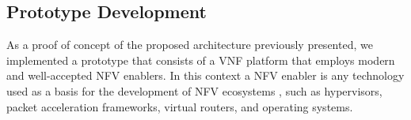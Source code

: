 

\subsection{Prototype Development}\label{PROTO}





As a proof of concept of the proposed architecture previously presented, we implemented a prototype that consists of a VNF platform that employs modern and well-accepted NFV enablers. In this context a NFV enabler is any technology used as a basis for the development of NFV ecosystems \cite{ETSI-2012}, such as hypervisors, packet acceleration frameworks, virtual routers, and operating systems.

